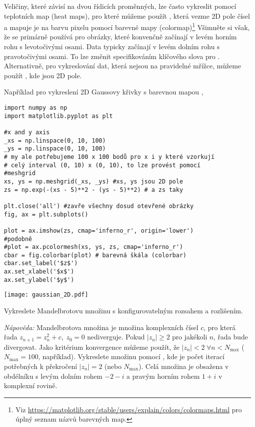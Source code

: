 Veličiny, které závisí na dvou řídicích proměnných, lze často vykreslit pomocí teplotních map (heat maps), pro které můžeme použít , která vezme 2D pole čísel a mapuje je na barvu pixelu pomocí barevné mapy (colormap)\footnote{Viz \url{https://matplotlib.org/stable/users/explain/colors/colormaps.html} pro úplný seznam názvů barevných map.} Všimněte si však, že  se primárně používá pro obrázky, které konvenčně začínají v levém horním rohu s levotočivými osami. Data typicky začínají v levém dolním rohu s pravotočivými osami. To lze změnit specifikováním klíčového slova  pro . Alternativně, pro vykreslování dat, která nejsou na pravidelné mřížce, můžeme použít , kde  jsou 2D pole.

Například pro vykreslení 2D Gaussovy křivky s barevnou mapou ,
\begin{lstlisting}[caption=Příklad dvourozměrného vykreslování.]
import numpy as np
import matplotlib.pyplot as plt

#x and y axis
_xs = np.linspace(0, 10, 100)
_ys = np.linspace(0, 10, 100)
# my ale potřebujeme 100 x 100 bodů pro x i y které vzorkují
# celý interval (0, 10) x (0, 10), to lze provést pomocí
#meshgrid
xs, ys = np.meshgrid(_xs, _ys) #xs, ys jsou 2D pole
zs = np.exp(-(xs - 5)**2 - (ys - 5)**2) # a zs taky

plt.close('all') #zavře všechny dosud otevřené obrázky
fig, ax = plt.subplots()

plot = ax.imshow(zs, cmap='inferno_r', origin='lower')
#podobně
#plot = ax.pcolormesh(xs, ys, zs, cmap='inferno_r') 
cbar = fig.colorbar(plot) # barevná škála (colorbar)
cbar.set_label('$z$')
ax.set_xlabel('$x$')
ax.set_ylabel('$y$')
\end{lstlisting}
\begin{center}
    \texttt{[image: gaussian\_2D.pdf]}
\end{center}
\begin{exercise}
    Vykreslete Mandelbrotovu množinu s konfigurovatelným rozsahem a rozlišením.

    \emph{Nápověda:} Mandelbrotova množina je množina komplexních čísel $c$, pro která řada $z_{n+1} = z_n^2 + c,\; z_0 = 0$ nediverguje. Pokud $|z_n| \geq 2$ pro jakékoli $n$, řada bude divergovat. Jako kritérium konvergence můžeme použít, že $|z_n| < 2\; \forall n < N_\mathrm{max}$ ($N_\mathrm{max} = 100$, například). Vykreslete množinu pomocí , kde  je počet iterací potřebných k překročení $|z_n| = 2$ (nebo $N_\mathrm{max}$). Celá množina je obsažena v obdélníku s levým dolním rohem $-2-i$ a pravým horním rohem $1+i$ v komplexní rovině.
\end{exercise}

